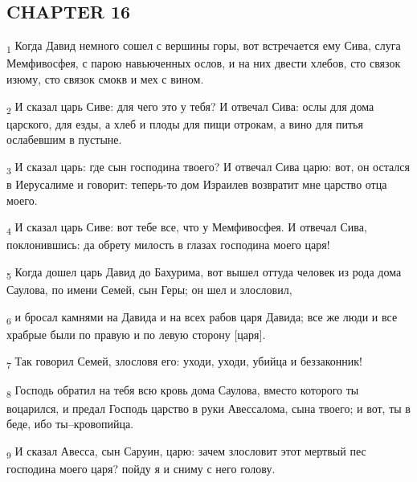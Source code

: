 \subsection{CHAPTER 16}
\begin{tcolorbox}
\textsubscript{1} Когда Давид немного сошел с вершины горы, вот встречается ему Сива, слуга Мемфивосфея, с парою навьюченных ослов, и на них двести хлебов, сто связок изюму, сто связок смокв и мех с вином.
\end{tcolorbox}
\begin{tcolorbox}
\textsubscript{2} И сказал царь Сиве: для чего это у тебя? И отвечал Сива: ослы для дома царского, для езды, а хлеб и плоды для пищи отрокам, а вино для питья ослабевшим в пустыне.
\end{tcolorbox}
\begin{tcolorbox}
\textsubscript{3} И сказал царь: где сын господина твоего? И отвечал Сива царю: вот, он остался в Иерусалиме и говорит: теперь-то дом Израилев возвратит мне царство отца моего.
\end{tcolorbox}
\begin{tcolorbox}
\textsubscript{4} И сказал царь Сиве: вот тебе все, что у Мемфивосфея. И отвечал Сива, поклонившись: да обрету милость в глазах господина моего царя!
\end{tcolorbox}
\begin{tcolorbox}
\textsubscript{5} Когда дошел царь Давид до Бахурима, вот вышел оттуда человек из рода дома Саулова, по имени Семей, сын Геры; он шел и злословил,
\end{tcolorbox}
\begin{tcolorbox}
\textsubscript{6} и бросал камнями на Давида и на всех рабов царя Давида; все же люди и все храбрые были по правую и по левую сторону [царя].
\end{tcolorbox}
\begin{tcolorbox}
\textsubscript{7} Так говорил Семей, злословя его: уходи, уходи, убийца и беззаконник!
\end{tcolorbox}
\begin{tcolorbox}
\textsubscript{8} Господь обратил на тебя всю кровь дома Саулова, вместо которого ты воцарился, и предал Господь царство в руки Авессалома, сына твоего; и вот, ты в беде, ибо ты--кровопийца.
\end{tcolorbox}
\begin{tcolorbox}
\textsubscript{9} И сказал Авесса, сын Саруин, царю: зачем злословит этот мертвый пес господина моего царя? пойду я и сниму с него голову.
\end{tcolorbox}
